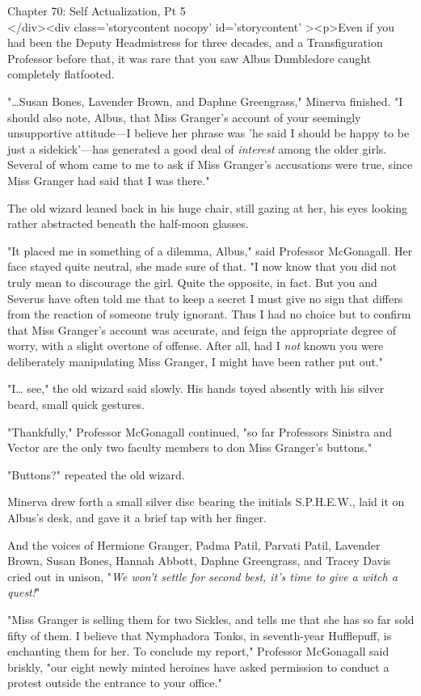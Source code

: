 
Chapter 70: Self Actualization, Pt 5\\
</div><div  class='storycontent nocopy' id='storycontent' ><p>Even if you had been the Deputy Headmistress for three decades, and a Transfiguration Professor before that, it was rare that you saw Albus Dumbledore caught completely flatfooted.

"{\ldots}Susan Bones, Lavender Brown, and Daphne Greengrass," Minerva finished. "I should also note, Albus, that Miss Granger's account of your seemingly unsupportive attitude---I believe her phrase was 'he said I should be happy to be just a sidekick'---has generated a good deal of \emph{interest} among the older girls. Several of whom came to me to ask if Miss Granger's accusations were true, since Miss Granger had said that I was there."

The old wizard leaned back in his huge chair, still gazing at her, his eyes looking rather abstracted beneath the half-moon glasses.

"It placed me in something of a dilemma, Albus," said Professor McGonagall. Her face stayed quite neutral, she made sure of that. "I now know that you did not truly mean to discourage the girl. Quite the opposite, in fact. But you and Severus have often told me that to keep a secret I must give no sign that differs from the reaction of someone truly ignorant. Thus I had no choice but to confirm that Miss Granger's account was accurate, and feign the appropriate degree of worry, with a slight overtone of offense. After all, had I \emph{not} known you were deliberately manipulating Miss Granger, I might have been rather put out."

"I{\ldots} see," the old wizard said slowly. His hands toyed absently with his silver beard, small quick gestures.

"Thankfully," Professor McGonagall continued, "so far Professors Sinistra and Vector are the only two faculty members to don Miss Granger's buttons."

"Buttons?" repeated the old wizard.

Minerva drew forth a small silver disc bearing the initials S.P.H.E.W., laid it on Albus's desk, and gave it a brief tap with her finger.

And the voices of Hermione Granger, Padma Patil, Parvati Patil, Lavender Brown, Susan Bones, Hannah Abbott, Daphne Greengrass, and Tracey Davis cried out in unison, "\emph{We won't settle for second best, it's time to give a witch a quest!}"

"Miss Granger is selling them for two Sickles, and tells me that she has so far sold fifty of them. I believe that Nymphadora Tonks, in seventh-year Hufflepuff, is enchanting them for her. To conclude my report," Professor McGonagall said briskly, "our eight newly minted heroines have asked permission to conduct a protest outside the entrance to your office."

